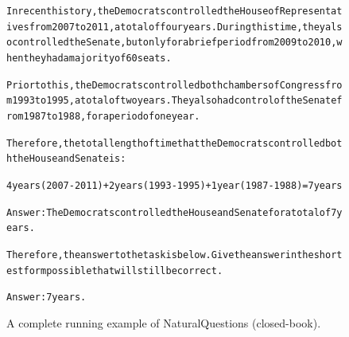 \begin{figure}[t]
{{\begin{alltt}
In recent history, the Democrats controlled the House of Representatives from 2007 to 2011, a total of four years. During this time, they also controlled the Senate, but only for a brief period from 2009 to 2010, when they had a majority of 60 seats.

Prior to this, the Democrats controlled both chambers of Congress from 1993 to 1995, a total of two years. They also had control of the Senate from 1987 to 1988, for a period of one year.

Therefore, the total length of time that the Democrats controlled both the House and Senate is:

4 years (2007-2011) + 2 years (1993-1995) + 1 year (1987-1988) = 7 years

Answer: The Democrats controlled the House and Senate for a total of 7 years.

Therefore, the answer to the task is below. Give the answer in the shortest form possible that will still be correct.

Answer: 7 years.
\end{alltt}
}}
\caption{A complete running example of NaturalQuestions (closed-book).}
\label{fig:natural_qa_mode=closedbook_example}
\end{figure}
